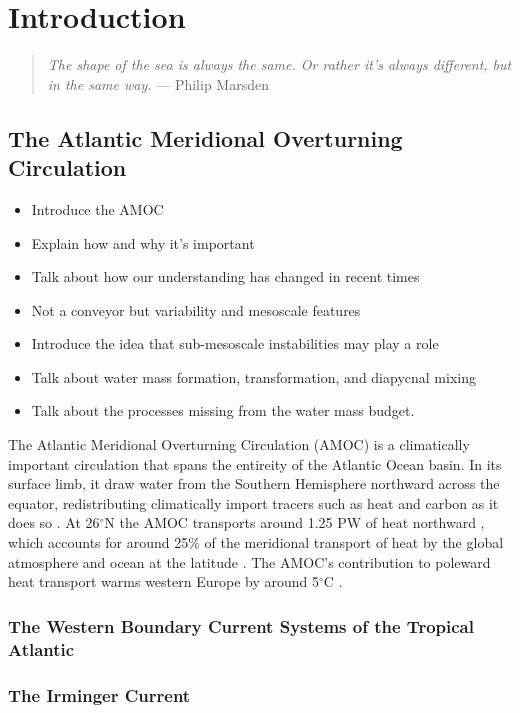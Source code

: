 \chapter{Introduction}
\begin{quote}
\textit{The shape of the sea is always the same. Or rather it's always different, but in the same way.} --- Philip Marsden
\end{quote}

\section{The Atlantic Meridional Overturning Circulation}
\begin{itemize}
    \item Introduce the AMOC
    \item Explain how and why it's important
    \item Talk about how our understanding has changed in recent times
    \item Not a conveyor but variability and mesoscale features
    \item Introduce the idea that sub-mesoscale instabilities may play a role
    \item Talk about water mass formation, transformation, and diapycnal mixing
    \item Talk about the processes missing from the water mass budget.
\end{itemize}
The Atlantic Meridional Overturning Circulation (AMOC) is a climatically important circulation that spans the entireity of the Atlantic Ocean basin. In its surface limb, it draw water from the Southern Hemisphere northward across the equator, redistributing climatically import tracers such as heat and carbon as it does so \citep{Buckley2016}. At 26$^\circ$N the AMOC transports around 1.25 PW of heat northward \citep{Bryden2020}, which accounts for around 25\% of the meridional transport of heat by the global atmosphere and ocean at the latitude \citep{Srokosz2012}. The AMOC's contribution to poleward heat transport warms western Europe by around 5$^\circ$C \citep{Jackson2015}.

\subsection{The Western Boundary Current Systems of  the Tropical Atlantic}

\subsection{The Irminger Current}

